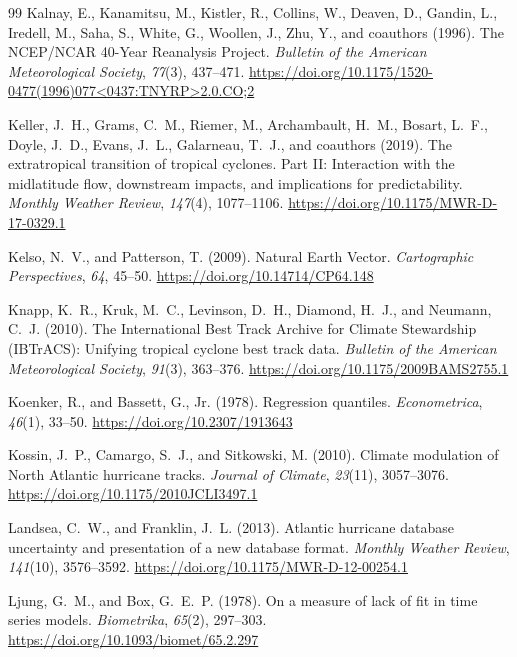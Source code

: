 \documentclass[11pt]{article}
\begin{document}
\begin{thebibliography}{99}
Kalnay, E., Kanamitsu, M., Kistler, R., Collins, W., Deaven, D., Gandin, L., Iredell, M., Saha, S., White, G., Woollen, J., Zhu, Y., and coauthors (1996).
The NCEP/NCAR 40-Year Reanalysis Project.
\textit{Bulletin of the American Meteorological Society}, \textit{77}(3), 437--471.
\url{https://doi.org/10.1175/1520-0477(1996)077<0437:TNYRP>2.0.CO;2}

Keller, J.~H., Grams, C.~M., Riemer, M., Archambault, H.~M., Bosart, L.~F., Doyle, J.~D., Evans, J.~L., Galarneau, T.~J., and coauthors (2019).
The extratropical transition of tropical cyclones. Part II: Interaction with the midlatitude flow, downstream impacts, and implications for predictability.
\textit{Monthly Weather Review}, \textit{147}(4), 1077--1106.
\url{https://doi.org/10.1175/MWR-D-17-0329.1}

Kelso, N.~V., and Patterson, T. (2009).
Natural Earth Vector.
\textit{Cartographic Perspectives}, \textit{64}, 45--50.
\url{https://doi.org/10.14714/CP64.148}

Knapp, K.~R., Kruk, M.~C., Levinson, D.~H., Diamond, H.~J., and Neumann, C.~J. (2010).
The International Best Track Archive for Climate Stewardship (IBTrACS): Unifying tropical cyclone best track data.
\textit{Bulletin of the American Meteorological Society}, \textit{91}(3), 363--376.
\url{https://doi.org/10.1175/2009BAMS2755.1}

Koenker, R., and Bassett, G., Jr. (1978).
Regression quantiles.
\textit{Econometrica}, \textit{46}(1), 33--50.
\url{https://doi.org/10.2307/1913643}

Kossin, J.~P., Camargo, S.~J., and Sitkowski, M. (2010).
Climate modulation of North Atlantic hurricane tracks.
\textit{Journal of Climate}, \textit{23}(11), 3057--3076.
\url{https://doi.org/10.1175/2010JCLI3497.1}


Landsea, C.~W., and Franklin, J.~L. (2013).
Atlantic hurricane database uncertainty and presentation of a new database format.
\textit{Monthly Weather Review}, \textit{141}(10), 3576--3592.
\url{https://doi.org/10.1175/MWR-D-12-00254.1}

Ljung, G.~M., and Box, G.~E.~P. (1978).
On a measure of lack of fit in time series models.
\textit{Biometrika}, \textit{65}(2), 297--303.
\url{https://doi.org/10.1093/biomet/65.2.297}


\end{thebibliography}
\end{document}
